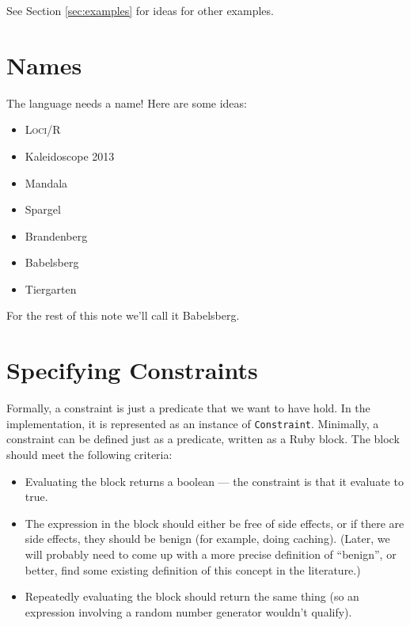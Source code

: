 \documentclass[11pt]{article}
\begin{document}
See Section \ref{sec:examples} for ideas for other examples.

\section{Names}

The language needs a name!  Here are some ideas:

\begin{itemize}
\item \textsc{Loci/R}
\item Kaleidoscope 2013
\item Mandala
\item Spargel
\item Brandenberg
\item Babelsberg
\item Tiergarten
\end{itemize}

For the rest of this note we'll call it Babelsberg.

\section{Specifying Constraints}
\label{sec:specifying-constraints}

Formally, a constraint is just a predicate that we want to have hold.
In the implementation, it is represented as an instance of
\lstinline{Constraint}.  Minimally, a constraint can be defined just
as a predicate, written as a Ruby block.  The block should meet the
following criteria:

\begin{itemize}

\item Evaluating the block returns a boolean --- the constraint is
  that it evaluate to true.

\item The expression in the block should either be free of side
  effects, or if there are side effects, they should be benign (for
  example, doing caching).  (Later, we will probably need to come up
  with a more precise definition of ``benign'', or better, find some
  existing definition of this concept in the literature.)

\item Repeatedly evaluating the block should return the same thing (so
  an expression involving a random number generator wouldn't qualify).

\end{itemize}
\end{document}

